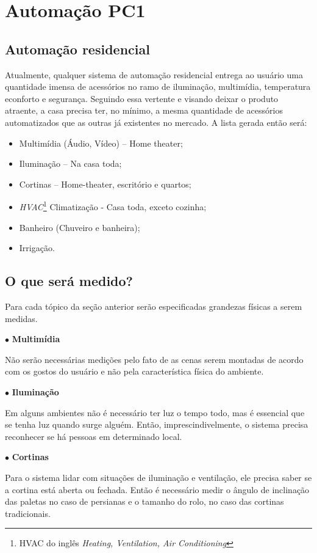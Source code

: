 \chapter{Automação PC1}
\section{Automação residencial}
Atualmente, qualquer sistema de automação residencial entrega ao usuário uma quantidade imensa de acessórios no ramo de iluminação, multimídia, temperatura econforto e segurança. Seguindo essa vertente e visando deixar o produto atraente, a casa precisa ter, no mínimo, a mesma quantidade de acessórios automatizados que as outras já existentes no mercado. A lista gerada então será:

\begin{itemize}
	\item Multimídia (Áudio, Vídeo) – Home theater;
	\item Iluminação – Na casa toda;
	\item Cortinas – Home-theater, escritório e quartos;
	\item \textit{HVAC}\footnote{HVAC do inglês \textit{Heating, Ventilation, Air Conditioning}} Climatização - Casa toda, exceto cozinha;
	\item Banheiro (Chuveiro e banheira);
	\item Irrigação.
\end{itemize}


\section{O que será medido?}

	Para cada tópico da seção anterior serão especificadas grandezas físicas a serem medidas.

$\bullet$ \textbf{Multimídia}

	Não serão necessárias medições pelo fato de as cenas serem montadas de acordo com os gostos do usuário e não pela característica física do ambiente.

$\bullet$ \textbf{Iluminação}

	Em alguns ambientes não é necessário ter luz o tempo todo, mas é essencial que se tenha luz quando surge alguém. Então, imprescindivelmente, o sistema precisa reconhecer se há pessoas em determinado local.

$\bullet$ \textbf{Cortinas}

	Para o sistema lidar com situações de iluminação e ventilação, ele precisa saber se a cortina está aberta ou fechada. Então é necessário medir o ângulo de inclinação das paletas no caso de persianas e o tamanho do rolo, no caso das cortinas tradicionais.

